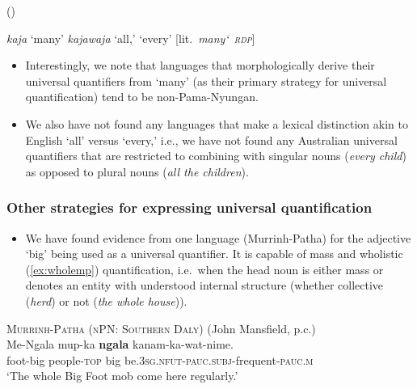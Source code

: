 \documentclass{article}
\begin{document}
\newpage

\begin{exe}
 (\citealt[54]{mushin12})
\begin{xlist}
\ex \textit{kaja} `many'
\ex \textit{kajawaja}  `all,' `every' [lit.\ \textit{many\char`~\textsc{rdp}}]
\end{xlist}
\end{exe}


\begin{itemize}
    \item Interestingly, we note that languages that morphologically derive their universal quantifiers from `many' (as their primary strategy for universal quantification) tend to be non-Pama-Nyungan.
    \item We also have not found any languages that make a lexical distinction akin to English `all' versus `every,' i.e., we have not found any Australian universal quantifiers that are restricted to combining with singular nouns ({\it every child}) as opposed to plural nouns ({\it all the children}).
\end{itemize}

\subsubsection{Other strategies for expressing universal quantification
\label{sec:uqbig}}

\begin{itemize}
\item We have found evidence from one language (Murrinh-Patha) for the adjective `big' being used as a universal quantifier. It is capable of mass and wholistic (\ref{ex:wholemp}) quantification, i.e.\ when the head noun is either mass or denotes an entity with understood internal structure (whether collective (\textit{herd}) or not (\textit{the whole house})).
\end{itemize}
\begin{exe}
\ex\label{ex:wholemp} \textsc{Murrinh-Patha (nPN: Southern Daly)} (John Mansfield, p.c.)\\
\gll Me-Ngala mup-ka     \textbf{ngala} kanam-ka-wat-nime.\\
foot-big  people-\textsc{top} big  be.\textsc{3sg.nfut-pauc.subj}-frequent-\textsc{pauc.m}\\
\glt `The whole Big Foot mob come here regularly.' %
\end{exe}
\end{document}
